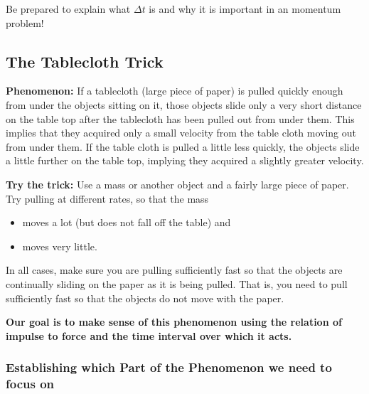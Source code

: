 Be prepared to explain what $\Delta t$ is and why it is important in an momentum problem!

\WCD

\subsection{The Tablecloth Trick}

\textbf{Phenomenon:} If a tablecloth (large piece of paper) is pulled quickly enough from under the objects sitting on it, those objects slide only a very short distance on the table top after the tablecloth has been pulled out from under them. This implies that they acquired only a small velocity from the table cloth moving out from under them. If the table cloth is pulled a little less quickly, the objects slide a little further on the table top, implying they acquired a slightly greater velocity.

\textbf{Try the trick:} Use a mass or another object and a fairly large piece of paper. Try pulling at different rates, so that the mass
	\begin{itemize}
		\item moves a lot (but does not fall off the table) and
		\item moves very little.
	\end{itemize}
	In all cases, make sure you are pulling sufficiently fast so that the objects are continually sliding on the paper as it is being pulled. That is, you need to pull sufficiently fast so that the objects do not move with the paper.
	
\textbf{Our goal is to make sense of this phenomenon using the relation of impulse to force and the time interval over which it acts.}

\subsubsection*{Establishing which Part of the Phenomenon we need to focus on}

